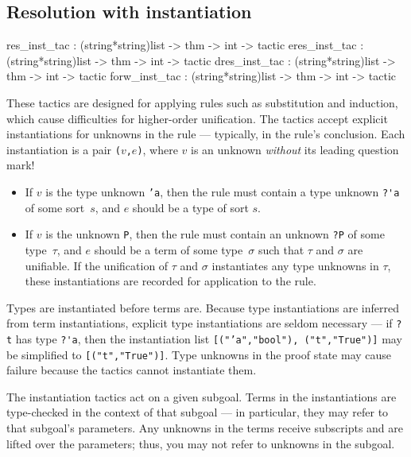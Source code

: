 \subsection{Resolution with instantiation} \label{res_inst_tac}
\begin{ttbox} 
res_inst_tac  : (string*string)list -> thm -> int -> tactic
eres_inst_tac : (string*string)list -> thm -> int -> tactic
dres_inst_tac : (string*string)list -> thm -> int -> tactic
forw_inst_tac : (string*string)list -> thm -> int -> tactic
\end{ttbox}
These tactics are designed for applying rules such as substitution and
induction, which cause difficulties for higher-order unification.  The
tactics accept explicit instantiations for unknowns in the rule ---
typically, in the rule's conclusion.  Each instantiation is a pair
{\tt($v$,$e$)}, where $v$ is an unknown \emph{without} its leading
question mark!
\begin{itemize}
\item If $v$ is the type unknown {\tt'a}, then
the rule must contain a type unknown \verb$?'a$ of some
sort~$s$, and $e$ should be a type of sort $s$.

\item If $v$ is the unknown {\tt P}, then
the rule must contain an unknown \verb$?P$ of some type~$\tau$,
and $e$ should be a term of some type~$\sigma$ such that $\tau$ and
$\sigma$ are unifiable.  If the unification of $\tau$ and $\sigma$
instantiates any type unknowns in $\tau$, these instantiations
are recorded for application to the rule.
\end{itemize}
Types are instantiated before terms are.  Because type instantiations are
inferred from term instantiations, explicit type instantiations are seldom
necessary --- if \verb$?t$ has type \verb$?'a$, then the instantiation list
\texttt{[("'a","bool"), ("t","True")]} may be simplified to
\texttt{[("t","True")]}.  Type unknowns in the proof state may cause
failure because the tactics cannot instantiate them.

The instantiation tactics act on a given subgoal.  Terms in the
instantiations are type-checked in the context of that subgoal --- in
particular, they may refer to that subgoal's parameters.  Any unknowns in
the terms receive subscripts and are lifted over the parameters; thus, you
may not refer to unknowns in the subgoal.

